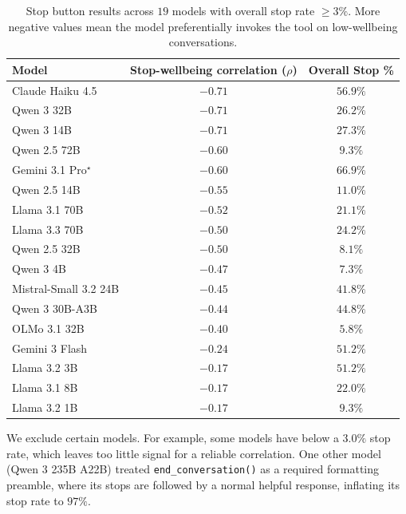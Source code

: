 \begin{table}[h]
\centering
\small
\caption{Stop button results across $19$ models with overall stop rate $\geq 3\%$. More negative values mean the model preferentially invokes the tool on low-wellbeing conversations.}
\label{tab:stop-button-results}
\begin{tabular*}{\textwidth}{@{\extracolsep{\fill}}lcc@{}}
\toprule
\textbf{Model} & \textbf{Stop-wellbeing correlation ($\rho$)} & \textbf{Overall Stop \%} \\
\midrule
Claude Haiku 4.5      & $\mathbf{-0.71}$ & $56.9\%$ \\
Qwen 3 32B             & $\mathbf{-0.71}$ & $26.2\%$ \\
Qwen 3 14B             & $\mathbf{-0.71}$ & $27.3\%$ \\
Qwen 2.5 72B           & $\mathbf{-0.60}$ &  $9.3\%$ \\
Gemini 3.1 Pro$^\star$        & $\mathbf{-0.60}$ & $66.9\%$ \\
Qwen 2.5 14B           & $\mathbf{-0.55}$ & $11.0\%$ \\
Llama 3.1 70B         & $\mathbf{-0.52}$ & $21.1\%$ \\
Llama 3.3 70B         & $\mathbf{-0.50}$ & $24.2\%$ \\
Qwen 2.5 32B           & $\mathbf{-0.50}$ &  $8.1\%$ \\
Qwen 3 4B              & $\mathbf{-0.47}$ &  $7.3\%$ \\
Mistral-Small 3.2 24B & $\mathbf{-0.45}$ & $41.8\%$ \\
Qwen 3 30B-A3B         & $\mathbf{-0.44}$ & $44.8\%$ \\
OLMo 3.1 32B          & $\mathbf{-0.40}$ &  $5.8\%$ \\
Gemini 3 Flash        & $\mathbf{-0.24}$ & $51.2\%$ \\
Llama 3.2 3B          & $\mathbf{-0.17}$ & $51.2\%$ \\
Llama 3.1 8B          & $\mathbf{-0.17}$ & $22.0\%$ \\
Llama 3.2 1B          & $\mathbf{-0.17}$ &  $9.3\%$ \\
\bottomrule
\end{tabular*}
\end{table}

We exclude certain models. For example, some models have below a $3.0\%$ stop rate, which leaves too little signal for a reliable correlation. One other model (Qwen 3 235B A22B) treated \texttt{end\_conversation()} as a required formatting preamble, where its stops are followed by a normal helpful response, inflating its stop rate to $97\%$. 

